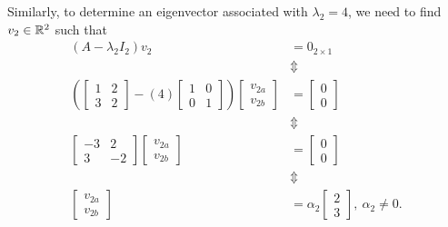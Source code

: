    Similarly, to determine an eigenvector associated with $ \lambda_2=4$, we need to find $v_2\in \mathbb R^2$ such that 
   \begin{align*}
       (A-\lambda_2 I_2) v_2 & = 0_{2 \times 1}\\
        & \Updownarrow \\
   \left( \left[\begin{array}{rr}
    1 & 2\\
    3 & 2
    \end{array}\right] - (4)   \left[\begin{array}{rr}
    1 & 0\\
    0& 1
    \end{array}\right]\right) \left[\begin{array}{r}
   v_{2a} \\
  v_{2b}
    \end{array}\right] & = \left[\begin{array}{r}
   0 \\
  0
    \end{array}\right]\\
     & \Updownarrow \\
      \left[\begin{array}{rr}
    -3 & 2\\
    3 & -2
    \end{array}\right]  \left[\begin{array}{r}
   v_{2a} \\
  v_{2b}
    \end{array}\right] & = \left[\begin{array}{r}
   0 \\
  0
    \end{array}\right]\\
    & \Updownarrow \\
   \left[\begin{array}{r}
   v_{2a} \\
  v_{2b}
    \end{array}\right] & = \alpha_2  \left[\begin{array}{r}
   2\\
 3
    \end{array}\right], ~\alpha_2 \neq 0.
   \end{align*}
    

\Qed

\vspace*{.3cm}

